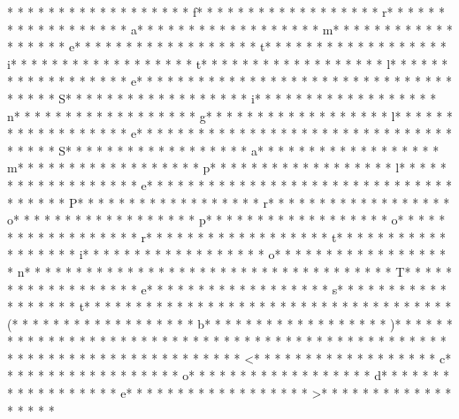 * * *  * * *  * * *  *  * * *  *  * * *  * f* * *  * * *  * * *  *  * * *  *  * * *  * r* * *  * * *  * * *  *  * * *  *  * * *  * a* * *  * * *  * * *  *  * * *  *  * * *  * m* * *  * * *  * * *  *  * * *  *  * * *  * e* * *  * * *  * * *  *  * * *  *  * * *  * t* * *  * * *  * * *  *  * * *  *  * * *  * i* * *  * * *  * * *  *  * * *  *  * * *  * t* * *  * * *  * * *  *  * * *  *  * * *  * l* * *  * * *  * * *  *  * * *  *  * * *  * e* * *  * * *  * * *  *  * * *  *  * * *  * {* * *  * * *  * * *  *  * * *  *  * * *  * S* * *  * * *  * * *  *  * * *  *  * * *  * i* * *  * * *  * * *  *  * * *  *  * * *  * n* * *  * * *  * * *  *  * * *  *  * * *  * g* * *  * * *  * * *  *  * * *  *  * * *  * l* * *  * * *  * * *  *  * * *  *  * * *  * e* * *  * * *  * * *  *  * * *  *  * * *  *  * * *  * * *  * * *  *  * * *  *  * * *  * S* * *  * * *  * * *  *  * * *  *  * * *  * a* * *  * * *  * * *  *  * * *  *  * * *  * m* * *  * * *  * * *  *  * * *  *  * * *  * p* * *  * * *  * * *  *  * * *  *  * * *  * l* * *  * * *  * * *  *  * * *  *  * * *  * e* * *  * * *  * * *  *  * * *  *  * * *  *  * * *  * * *  * * *  *  * * *  *  * * *  * P* * *  * * *  * * *  *  * * *  *  * * *  * r* * *  * * *  * * *  *  * * *  *  * * *  * o* * *  * * *  * * *  *  * * *  *  * * *  * p* * *  * * *  * * *  *  * * *  *  * * *  * o* * *  * * *  * * *  *  * * *  *  * * *  * r* * *  * * *  * * *  *  * * *  *  * * *  * t* * *  * * *  * * *  *  * * *  *  * * *  * i* * *  * * *  * * *  *  * * *  *  * * *  * o* * *  * * *  * * *  *  * * *  *  * * *  * n* * *  * * *  * * *  *  * * *  *  * * *  *  * * *  * * *  * * *  *  * * *  *  * * *  * T* * *  * * *  * * *  *  * * *  *  * * *  * e* * *  * * *  * * *  *  * * *  *  * * *  * s* * *  * * *  * * *  *  * * *  *  * * *  * t* * *  * * *  * * *  *  * * *  *  * * *  *  * * *  * * *  * * *  *  * * *  *  * * *  * (* * *  * * *  * * *  *  * * *  *  * * *  * b* * *  * * *  * * *  *  * * *  *  * * *  * )* * *  * * *  * * *  *  * * *  *  * * *  * }* * *  * * *  * * *  *  * * *  *  * * *  * 
* * *  * * *  * * *  *  * * *  *  * * *  * 
* * *  * * *  * * *  *  * * *  *  * * *  * <* * *  * * *  * * *  *  * * *  *  * * *  * c* * *  * * *  * * *  *  * * *  *  * * *  * o* * *  * * *  * * *  *  * * *  *  * * *  * d* * *  * * *  * * *  *  * * *  *  * * *  * e* * *  * * *  * * *  *  * * *  *  * * *  * >* * *  * * *  * * *  *  * * *  *  * * *  * 

